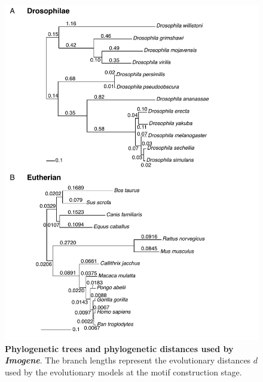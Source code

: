 \documentclass[a4,center,fleqn]{NAR}
\begin{document}
\clearpage
\begin{figure}[!htbp]
\begin{center}
\includegraphics[width=15cm]{figuresnar-sub/fig2.pdf}
\end{center}
\caption{\normalsize
{\bf Phylogenetic trees and  phylogenetic distances used by {\em
    Imogene}}.
    The branch lengths represent the evolutionary distances $d$ used by the
evolutionary models at the motif construction stage.}
  \label{fig:tree}
\end{figure}
\end{document}
